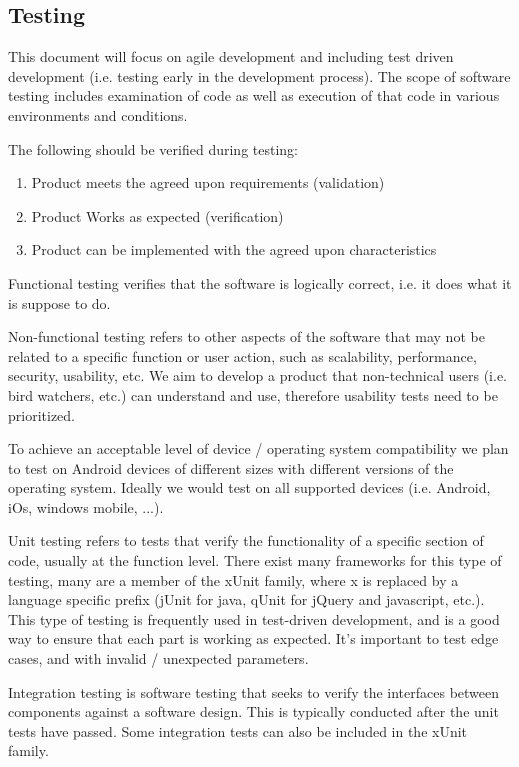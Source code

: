 
\subsection{Testing}

This document will focus on agile development and including test driven
development (i.e. testing early in the development process).  The scope of
software testing includes examination of code as well as execution of that code
in various environments and conditions.

The following should be verified during testing: \cite{wiki:software-testing}
\begin{enumerate}
	\item Product meets the agreed upon requirements (validation)
	\item Product Works as expected (verification)
	\item Product can be implemented with the agreed upon characteristics
\end{enumerate}

Functional testing verifies that the software is logically correct, 
i.e. it does what it is suppose to do.

Non-functional testing refers to other aspects of the software that may not be
related to a specific function or user action, such as scalability,
performance, security, usability, etc.  We aim to develop a product that
non-technical users (i.e.  bird watchers, etc.) can understand and use,
therefore usability tests need to be prioritized.

To achieve an acceptable level of device / operating system compatibility we
plan to test on Android devices of different sizes with different versions of
the operating system.  Ideally we would test on all supported devices (i.e.
Android, iOs, windows mobile, ...).

Unit testing refers to tests that verify the functionality of a specific
section of code, usually at the function level. There exist many frameworks for
this type of testing, many are a member of the xUnit family, where x is
replaced by a language specific prefix (jUnit for java, qUnit for jQuery and
javascript, etc.).  This type of testing is frequently used in test-driven
development, and is a good way to ensure that each part is working as expected.
It's important to test edge cases, and with invalid / unexpected parameters.

Integration testing is software testing that seeks to verify the interfaces
between components against a software design. This is typically conducted after
the unit tests have passed. Some integration tests can also be included in the
xUnit family.

